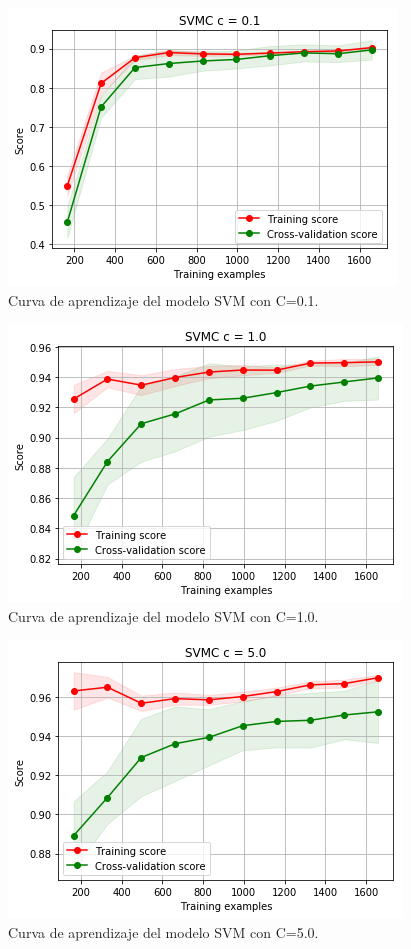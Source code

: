 \documentclass[11pt,a4paper]{article}
\begin{document}
\begin{figure}[H]
    \centering
    \includegraphics[scale=0.7]{img/lc-svm-c-01.png}
    \caption{Curva de aprendizaje del modelo SVM con C=0.1.}
    \label{fig:lc-svm-c-01}
\end{figure}

\begin{figure}[H]
    \centering
    \includegraphics[scale=0.7]{img/lc-svm-c-1.png}
    \caption{Curva de aprendizaje del modelo SVM con C=1.0.}
    \label{fig:lc-svm-c-1}
\end{figure}

\begin{figure}[H]
    \centering
    \includegraphics[scale=0.7]{img/lc-svm-c-5.png}
    \caption{Curva de aprendizaje del modelo SVM con C=5.0.}
    \label{fig:lc-svm-c-5}
\end{figure}
\end{document}
